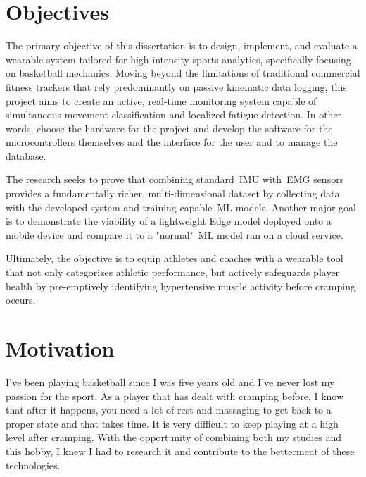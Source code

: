 
 
\section{Objectives}
\label{sec:objectives}

The primary objective of this dissertation is to design, implement, and evaluate a wearable system tailored for high-intensity sports analytics, specifically focusing on basketball mechanics. Moving beyond the 
limitations of traditional commercial fitness trackers that rely predominantly on passive kinematic data logging, this project aims to create an active, real-time monitoring system capable of simultaneous 
movement classification and localized fatigue detection. In other words,  choose the hardware for the project and
develop the software for the microcontrollers themselves and the interface for the user
and to manage the database.

The research seeks to prove that combining standard~\gls{IMU} with~\gls{EMG} sensors provides a fundamentally richer, multi-dimensional dataset by collecting data with the developed system and training capable~\gls{ML} 
models. Another major goal is to demonstrate the viability of a lightweight Edge model deployed onto a mobile device and compare it to a "normal"~\gls{ML} model ran on a cloud service.

Ultimately, the objective is to equip athletes and coaches with a wearable tool that not only categorizes athletic performance, but actively safeguards player health by pre-emptively identifying hypertensive 
muscle activity before cramping occurs.


\section{Motivation}
\label{sec:motivation}

I've been playing basketball since I was five years old and I've never lost my passion for the sport. As a player that has dealt with cramping before, I know that after it happens, you need a lot of rest and massaging to 
get back to a proper state and that takes time. It is very difficult to keep playing at a high level after cramping. With the opportunity of combining both my studies and this hobby, I knew I had to research it and 
contribute to the betterment of these technologies.


